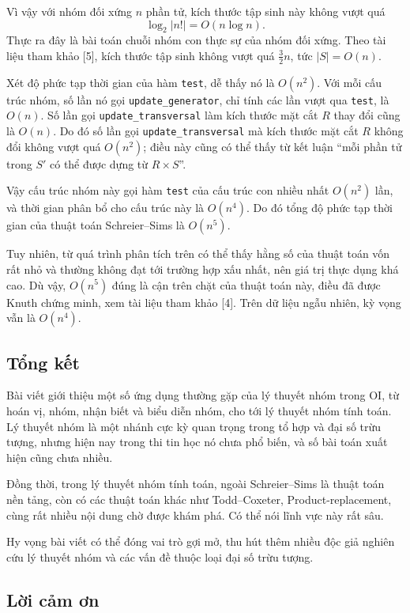 \documentclass[11pt]{article}
\begin{document}
Vì vậy với nhóm đối xứng \(n\) phần tử, kích thước tập sinh này không vượt quá
\[
  \log_2|n!|=O(n\log n).
\]
Thực ra đây là bài toán chuỗi nhóm con thực sự của nhóm đối xứng. Theo tài liệu
tham khảo [5], kích thước tập sinh không vượt quá \(\frac32 n\), tức
\(|S|=O(n)\).

Xét độ phức tạp thời gian của hàm \texttt{test}, dễ thấy nó là \(O(n^2)\). Với
mỗi cấu trúc nhóm, số lần nó gọi \texttt{update\_generator}, chỉ tính các lần
vượt qua \texttt{test}, là \(O(n)\). Số lần gọi \texttt{update\_transversal}
làm kích thước mặt cắt \(R\) thay đổi cũng là \(O(n)\). Do đó số lần gọi
\texttt{update\_transversal} mà kích thước mặt cắt \(R\) không đổi không vượt
quá \(O(n^2)\); điều này cũng có thể thấy từ kết luận ``mỗi phần tử trong
\(S'\) có thể được dựng từ \(R\times S\)''.

Vậy cấu trúc nhóm này gọi hàm \texttt{test} của cấu trúc con nhiều nhất
\(O(n^2)\) lần, và thời gian phân bổ cho cấu trúc này là \(O(n^4)\). Do đó tổng độ phức tạp
thời gian của thuật toán Schreier--Sims là \(O(n^5)\).

Tuy nhiên, từ quá trình phân tích trên có thể thấy hằng số của thuật toán vốn
rất nhỏ và thường không đạt tới trường hợp xấu nhất, nên giá trị thực dụng khá
cao. Dù vậy, \(O(n^5)\) đúng là cận trên chặt của thuật toán này, điều đã được
Knuth chứng minh, xem tài liệu tham khảo [4]. Trên dữ liệu ngẫu nhiên, kỳ vọng
vẫn là \(O(n^4)\).

\subsection{Tổng kết}

Bài viết giới thiệu một số ứng dụng thường gặp của lý thuyết nhóm trong OI, từ
hoán vị, nhóm, nhận biết và biểu diễn nhóm, cho tới lý thuyết nhóm tính toán.
Lý thuyết nhóm là một nhánh cực kỳ quan trọng trong tổ hợp và đại số trừu
tượng, nhưng hiện nay trong thi tin học nó chưa phổ biến, và số bài toán xuất
hiện cũng chưa nhiều.

Đồng thời, trong lý thuyết nhóm tính toán, ngoài Schreier--Sims là thuật toán
nền tảng, còn có các thuật toán khác như Todd--Coxeter, Product-replacement,
cùng rất nhiều nội dung chờ được khám phá. Có thể nói lĩnh vực này rất sâu.

Hy vọng bài viết có thể đóng vai trò gợi mở, thu hút thêm nhiều độc giả nghiên
cứu lý thuyết nhóm và các vấn đề thuộc loại đại số trừu tượng.

\subsection*{Lời cảm ơn}
\end{document}
